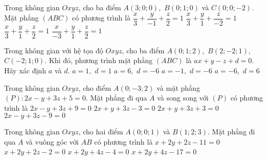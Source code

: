 \begin{ex}%
	Trong không gian $O x y z$, cho ba điểm $A(3 ; 0 ; 0),$ $ B(0 ; 1 ; 0)$ và $C(0 ; 0 ;-2)$. Mặt phẳng $(A B C)$ có phương trình là
	\choice
	{$\dfrac{x}{3}+\dfrac{y}{-1}+\dfrac{z}{2}=1$}
	{\True $\dfrac{x}{3}+\dfrac{y}{1}+\dfrac{z}{-2}=1$}
	{$\dfrac{x}{3}+\dfrac{y}{1}+\dfrac{z}{2}=1$}
	{$\dfrac{x}{-3}+\dfrac{y}{1}+\dfrac{z}{2}=1$}
\end{ex}
\begin{ex}%
	Trong không gian với hệ tọa độ $O x y z$, cho ba điểm $A(0 ; 1 ; 2), $ $B(2 ;-2 ; 1),$ $ C(-2 ; 1 ; 0)$. Khi đó, phương trình mặt phẳng $(A B C)$ là $a x+y-z+d=0$. Hãy xác định $a$ và $d$.
	\choice
	{\True $a=1,$ $ d=1$}
	{$a=6, $ $d=-6$}
	{$a=-1, $ $d=-6$}
	{$a=-6, $ $d=6$}
\end{ex}

\begin{ex}%
	Trong không gian $O x y z$, cho điểm $A(0 ;-3 ; 2)$ và mặt phẳng $(P)\colon 2 x-y+3 z+5=0$. Mặt phẳng đi qua $A$ và song song với $(P)$ có phương trình là
	\choice
	{$2 x-y+3 z+9=0$}
	{$2 x+y+3 z-3=0$}
	{$2 x+y+3 z+3=0$}
	{\True $2 x-y+3 z-9=0$}
\end{ex}
\begin{ex}%
	Trong không gian $O x y z$, cho hai điểm $A(0 ; 0 ; 1)$ và $B(1 ; 2 ; 3)$. Mặt phẳng đi qua $A$ và vuông góc với $A B$ có phương trình là
	\choice
	{$x+2 y+2 z-11=0$}
	{\True $x+2 y+2 z-2=0$}
	{$x+2 y+4 z-4=0$}
	{$x+2 y+4 z-17=0$}
\end{ex}

